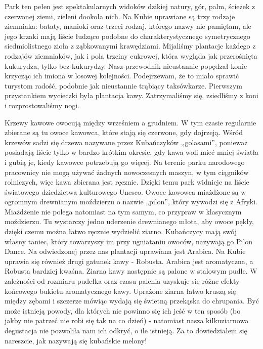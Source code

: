 \noindent Park ten pełen jest spektakularnych widoków dzikiej natury, gór, palm, ścieżek z czerwonej ziemi, zieleni dookoła nich.
Na Kubie uprawiane są trzy rodzaje ziemniaka: bataty, manioki oraz trzeci rodzaj, którego nazwy nie pamiętam, ale jego krzaki mają liście łudząco podobne do charakterystycznego symetrycznego siedmiolistnego zioła z ząbkowanymi krawędziami.
Mijaliśmy plantacje każdego z rodzajów ziemniaków, jak i pola trzciny cukrowej, która wygląda jak przerośnięta kukurydza, tylko bez kukurydzy.
Nasz przewodnik nieustannie popędzał konie krzycząc ich imiona w losowej kolejności.
Podejrzewam, że to miało sprawić turystom radość, podobnie jak nieustannie trąbiący taksówkarze.
Pierwszym przystankiem wycieczki była plantacja kawy.
Zatrzymaliśmy się, zsiedliśmy z koni i rozprostowaliśmy nogi.
\par Krzewy kawowe owocują między wrześniem a grudniem.
W tym czasie regularnie zbierane są tu owoce kawowca, które stają się czerwone, gdy dojrzeją.
Wśród krzewów sadzi się drzewa nazywane przez Kubańczyków „golasami”, ponieważ posiadają liście tylko w bardzo krótkim okresie, gdy kawa woli mieć mniej światła i gubią je, kiedy kawowce potrzebują go więcej.
Na terenie parku narodowego pracownicy nie mogą używać żadnych nowoczesnych maszyn, w tym ciągników rolniczych, więc kawa zbierana jest ręcznie.
Dzięki temu park widnieje na liście światowego dziedzictwa kulturowego Unesco.
Owoce kawowca miażdżone są w ogromnym drewnianym moździerzu o nazwie „pilon”, który wywodzi się z Afryki.
Miażdżenie nie polega natomiast na tym samym, co przypraw w klasycznym moździerzu.
Tu wystarczy jedno uderzenie drewnianego młota, aby owoce pękły, dzięki czemu można łatwo ręcznie wydzielić ziarno.
Kubańczycy mają swój własny taniec, który towarzyszy im przy ugniataniu owoców, nazywają go Pilon Dance.
Na odwiedzonej przez nas plantacji uprawiana jest Arabica.
Na Kubie uprawia się również drugi gatunek kawy - Robusta.
Arabica jest aromatyczna, a Robusta bardziej kwaśna.
Ziarna kawy następnie są palone w stalowym pudle.
W zależności od rozmiaru pudełka oraz czasu palenia uzyskuje się różne efekty końcowego bukietu aromatycznego kawy.
Uprażone ziarna łatwo kruszą się między zębami i szczerze mówiąc wydają się świetną przekąska do chrupania.
Być może istnieją powody, dla których nie powinno się ich jeść w ten sposób (bo jakby nie patrzeć nie robi się tak na co dzień) - natomiast nasza kilkuziarnowa degustacja nie pozwoliła nam ich odkryć, o ile istnieją.
Za to dowiedziałem się nareszcie, jak nazywają się kubańskie melony!
